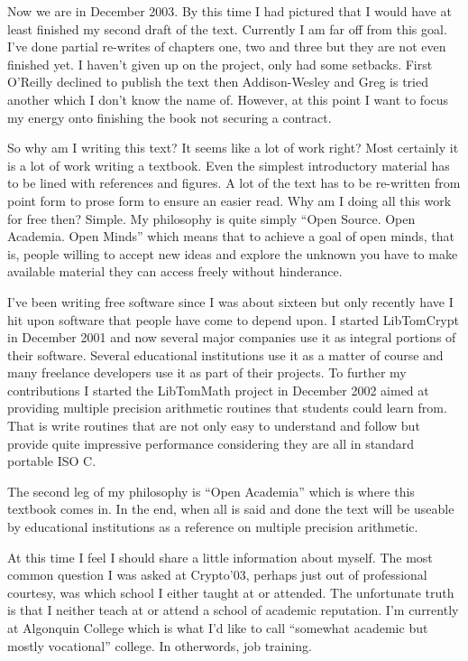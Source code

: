 \documentclass[b5paper]{book}
\begin{document}
Now we are in December 2003.  By this time I had pictured that I would have at least finished my second draft of the text.  
Currently I am far off from this goal.  I've done partial re-writes of chapters one, two and three but they are not even
finished yet.  I haven't given up on the project, only had some setbacks.  First O'Reilly declined to publish the text then
Addison-Wesley and Greg is tried another which I don't know the name of.  However, at this point I want to focus my energy
onto finishing the book not securing a contract.

So why am I writing this text?  It seems like a lot of work right?  Most certainly it is a lot of work writing a textbook.  
Even the simplest introductory material has to be lined with references and figures.  A lot of the text has to be re-written
from point form to prose form to ensure an easier read.  Why am I doing all this work for free then?  Simple. My philosophy
is quite simply ``Open Source.  Open Academia.  Open Minds'' which means that to achieve a goal of open minds, that is,
people willing to accept new ideas and explore the unknown you have to make available material they can access freely 
without hinderance.  

I've been writing free software since I was about sixteen but only recently have I hit upon software that people have come
to depend upon.  I started LibTomCrypt in December 2001 and now several major companies use it as integral portions of their
software.  Several educational institutions use it as a matter of course and many freelance developers use it as
part of their projects.  To further my contributions I started the LibTomMath project in December 2002 aimed at providing
multiple precision arithmetic routines that students could learn from.  That is write routines that are not only easy
to understand and follow but provide quite impressive performance considering they are all in standard portable ISO C.  

The second leg of my philosophy is ``Open Academia'' which is where this textbook comes in.  In the end, when all is
said and done the text will be useable by educational institutions as a reference on multiple precision arithmetic.  

At this time I feel I should share a little information about myself.  The most common question I was asked at 
Crypto'03, perhaps just out of professional courtesy, was which school I either taught at or attended.  The unfortunate
truth is that I neither teach at or attend a school of academic reputation.  I'm currently at Algonquin College which 
is what I'd like to call ``somewhat academic but mostly vocational'' college.  In otherwords, job training.
\end{document}

